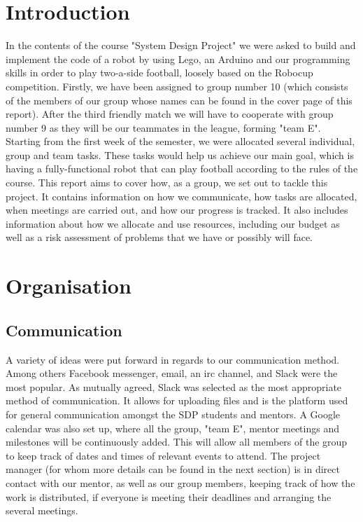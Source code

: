 \documentclass{article}
\begin{document}
\section{Introduction}
In the contents of the course "System Design Project" we were asked to build and
implement the code of a robot by using Lego, an Arduino and our programming
skills in order to play two-a-side football, loosely based on the Robocup
competition. Firstly, we have been assigned to group number 10 (which consists
of the members of our group whose names can be found in the cover page of this
report). After the third friendly match we will have to cooperate with group
number 9 as they will be our teammates in the league, forming "team E". Starting
from the first week of the semester, we were allocated several individual, group
and team tasks. These tasks would help us achieve our main goal, which is having
a fully-functional robot that can play football according to the rules of the
course. This report aims to cover how, as a group, we set out to tackle this
project. It contains information on how we communicate, how tasks are allocated,
when meetings are carried out, and how our progress is tracked. It also includes
information about how we allocate and use resources, including our budget as
well as a risk assessment of problems that we have or possibly will face.

\section{Organisation}
\subsection{Communication}
A variety of ideas were put forward in regards to our communication method.
Among others Facebook messenger, email, an irc channel, and Slack were the most
popular. As mutually agreed, Slack was selected as the most appropriate method
of communication. It allows for uploading files and is the platform used for
general communication amongst the SDP students and mentors. A Google calendar
was also set up, where all the group, "team E", mentor meetings and milestones
will be continuously added. This will allow all members of the group to keep
track of dates and times of relevant events to attend. The project manager (for
whom more details can be found in the next section) is in direct contact with
our mentor, as well as our group members, keeping track of how the work is
distributed, if everyone is meeting their deadlines and arranging the several
meetings.
\end{document}
